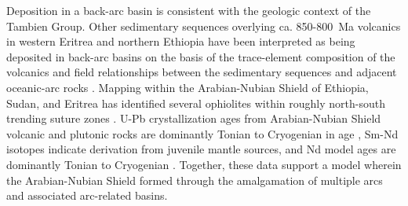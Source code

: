 \documentclass[11pt,letterpaper]{article}
\begin{document}
Deposition in a back-arc basin is consistent with the geologic context of the Tambien Group. Other sedimentary sequences overlying ca. 850-800~Ma volcanics in western Eritrea and northern Ethiopia have been interpreted as being deposited in back-arc basins on the basis of the trace-element composition of the volcanics and field relationships between the sedimentary sequences and adjacent oceanic-arc rocks \citep{Tadesse1999a, Teklay2003a, Teklay2006a}. Mapping within the Arabian-Nubian Shield of Ethiopia, Sudan, and Eritrea has identified several ophiolites within roughly north-south trending suture zones \citep{Berhe1990a}. U-Pb crystallization ages from Arabian-Nubian Shield volcanic and plutonic rocks are dominantly Tonian to Cryogenian in age \citep{Johnson2014a}, Sm-Nd isotopes indicate derivation from juvenile mantle sources, and Nd model ages are dominantly Tonian to Cryogenian \citep{Johnson2014a}. Together, these data support a model wherein the Arabian-Nubian Shield formed through the amalgamation of multiple arcs and associated arc-related basins.
\end{document}
